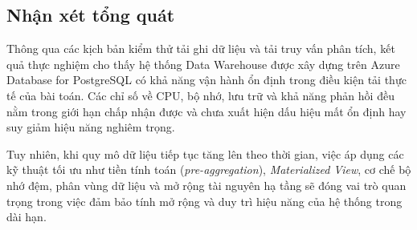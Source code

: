 \subsection{Nhận xét tổng quát}

Thông qua các kịch bản kiểm thử tải ghi dữ liệu và tải truy vấn phân tích, kết quả thực nghiệm cho thấy hệ thống Data Warehouse được xây dựng trên Azure Database for PostgreSQL có khả năng vận hành ổn định trong điều kiện tải thực tế của bài toán. Các chỉ số về CPU, bộ nhớ, lưu trữ và khả năng phản hồi đều nằm trong giới hạn chấp nhận được và chưa xuất hiện dấu hiệu mất ổn định hay suy giảm hiệu năng nghiêm trọng.

Tuy nhiên, khi quy mô dữ liệu tiếp tục tăng lên theo thời gian, việc áp dụng các kỹ thuật tối ưu như tiền tính toán (\textit{pre-aggregation}), \textit{Materialized View}, cơ chế bộ nhớ đệm, phân vùng dữ liệu và mở rộng tài nguyên hạ tầng sẽ đóng vai trò quan trọng trong việc đảm bảo tính mở rộng và duy trì hiệu năng của hệ thống trong dài hạn.
